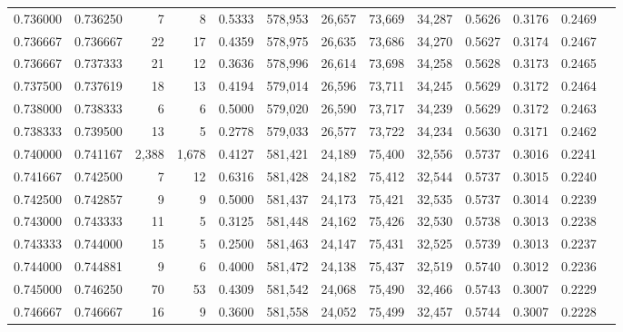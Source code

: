 \begin{tabular}{rrrrrrrrrrrrr}
0.736000 & 0.736250 &      7 &     8 &                                     0.5333 & 578,953 &  26,657 &  73,669 &  34,287 & 0.5626 & 0.3176 & 0.2469 \\
0.736667 & 0.736667 &     22 &    17 &                                     0.4359 & 578,975 &  26,635 &  73,686 &  34,270 & 0.5627 & 0.3174 & 0.2467 \\
0.736667 & 0.737333 &     21 &    12 &                                     0.3636 & 578,996 &  26,614 &  73,698 &  34,258 & 0.5628 & 0.3173 & 0.2465 \\
0.737500 & 0.737619 &     18 &    13 &                                     0.4194 & 579,014 &  26,596 &  73,711 &  34,245 & 0.5629 & 0.3172 & 0.2464 \\
0.738000 & 0.738333 &      6 &     6 &                                     0.5000 & 579,020 &  26,590 &  73,717 &  34,239 & 0.5629 & 0.3172 & 0.2463 \\
0.738333 & 0.739500 &     13 &     5 &                                     0.2778 & 579,033 &  26,577 &  73,722 &  34,234 & 0.5630 & 0.3171 & 0.2462 \\
0.740000 & 0.741167 &  2,388 & 1,678 &                                     0.4127 & 581,421 &  24,189 &  75,400 &  32,556 & 0.5737 & 0.3016 & 0.2241 \\
0.741667 & 0.742500 &      7 &    12 &                                     0.6316 & 581,428 &  24,182 &  75,412 &  32,544 & 0.5737 & 0.3015 & 0.2240 \\
0.742500 & 0.742857 &      9 &     9 &                                     0.5000 & 581,437 &  24,173 &  75,421 &  32,535 & 0.5737 & 0.3014 & 0.2239 \\
0.743000 & 0.743333 &     11 &     5 &                                     0.3125 & 581,448 &  24,162 &  75,426 &  32,530 & 0.5738 & 0.3013 & 0.2238 \\
0.743333 & 0.744000 &     15 &     5 &                                     0.2500 & 581,463 &  24,147 &  75,431 &  32,525 & 0.5739 & 0.3013 & 0.2237 \\
0.744000 & 0.744881 &      9 &     6 &                                     0.4000 & 581,472 &  24,138 &  75,437 &  32,519 & 0.5740 & 0.3012 & 0.2236 \\
0.745000 & 0.746250 &     70 &    53 &                                     0.4309 & 581,542 &  24,068 &  75,490 &  32,466 & 0.5743 & 0.3007 & 0.2229 \\
0.746667 & 0.746667 &     16 &     9 &                                     0.3600 & 581,558 &  24,052 &  75,499 &  32,457 & 0.5744 & 0.3007 & 0.2228 \\

\end{tabular}
